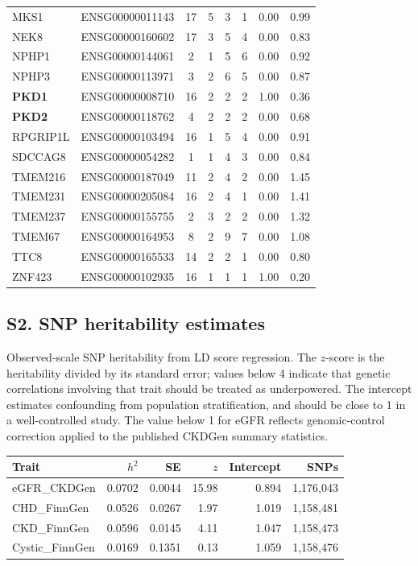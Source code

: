 \documentclass[11pt,a4paper]{article}
\begin{document}
\begin{longtable}{llccccrr}
MKS1 & ENSG00000011143 & 17 & 5 & 3 & 1 & 0.00 & 0.99 \\
NEK8 & ENSG00000160602 & 17 & 3 & 5 & 4 & 0.00 & 0.83 \\
NPHP1 & ENSG00000144061 & 2 & 1 & 5 & 6 & 0.00 & 0.92 \\
NPHP3 & ENSG00000113971 & 3 & 2 & 6 & 5 & 0.00 & 0.87 \\
\textbf{PKD1} & ENSG00000008710 & 16 & 2 & 2 & 2 & 1.00 & 0.36 \\
\textbf{PKD2} & ENSG00000118762 & 4 & 2 & 2 & 2 & 0.00 & 0.68 \\
RPGRIP1L & ENSG00000103494 & 16 & 1 & 5 & 4 & 0.00 & 0.91 \\
SDCCAG8 & ENSG00000054282 & 1 & 1 & 4 & 3 & 0.00 & 0.84 \\
TMEM216 & ENSG00000187049 & 11 & 2 & 4 & 2 & 0.00 & 1.45 \\
TMEM231 & ENSG00000205084 & 16 & 2 & 4 & 1 & 0.00 & 1.41 \\
TMEM237 & ENSG00000155755 & 2 & 3 & 2 & 2 & 0.00 & 1.32 \\
TMEM67 & ENSG00000164953 & 8 & 2 & 9 & 7 & 0.00 & 1.08 \\
TTC8 & ENSG00000165533 & 14 & 2 & 2 & 1 & 0.00 & 0.80 \\
ZNF423 & ENSG00000102935 & 16 & 1 & 1 & 1 & 1.00 & 0.20 \\
\bottomrule
\end{longtable}

\subsection*{S2. SNP heritability estimates}

Observed-scale SNP heritability from LD score regression. The $z$-score is the heritability
divided by its standard error; values below 4 indicate that genetic correlations involving
that trait should be treated as underpowered. The intercept estimates confounding from
population stratification, and should be close to 1 in a well-controlled study. The value
below 1 for eGFR reflects genomic-control correction applied to the published CKDGen summary
statistics.

\begin{table}[H]
\centering
\small
\begin{tabular}{lrrrrr}
\toprule
Trait & $h^2$ & SE & $z$ & Intercept & SNPs \\
\midrule
eGFR\_CKDGen & 0.0702 & 0.0044 & 15.98 & 0.894 & 1,176,043 \\
CHD\_FinnGen & 0.0526 & 0.0267 & 1.97 & 1.019 & 1,158,481 \\
CKD\_FinnGen & 0.0596 & 0.0145 & 4.11 & 1.047 & 1,158,473 \\
Cystic\_FinnGen & 0.0169 & 0.1351 & 0.13 & 1.059 & 1,158,476 \\
\bottomrule
\end{tabular}
\end{table}
\end{document}
